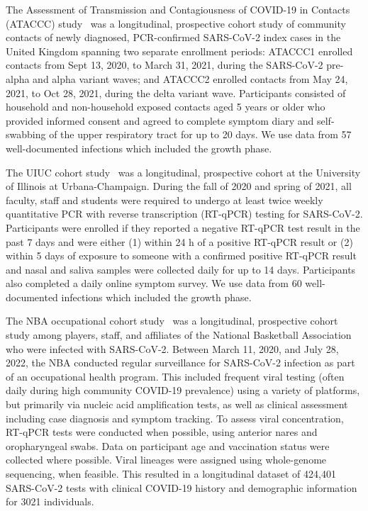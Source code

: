 \documentclass[12pt]{article}
\begin{document}
The Assessment of Transmission and Contagiousness of COVID-19 in Contacts (ATACCC) study~\cite{singanayagam2022community,hakki2022onset} was a longitudinal, prospective cohort study of community contacts of newly diagnosed, PCR-confirmed SARS-CoV-2 index cases in the United Kingdom spanning two separate enrollment periods: ATACCC1 enrolled contacts from Sept 13, 2020, to March 31, 2021, during the SARS-CoV-2 pre-alpha and alpha variant waves; and ATACCC2 enrolled contacts from May 24, 2021, to Oct 28, 2021, during the delta variant wave. Participants consisted of household and non-household exposed contacts aged 5 years or older who provided informed consent and agreed to complete symptom diary and self-swabbing of the upper respiratory tract for up to 20 days. We use data from 57 well-documented infections which included the growth phase. 

The UIUC cohort study~\cite{ke2022daily,Ranoa2022mitigation} was a longitudinal, prospective cohort at the University of Illinois at Urbana-Champaign. During the fall of 2020 and spring of 2021, all faculty, staff and students were required to undergo at least twice weekly quantitative PCR with reverse transcription (RT-qPCR) testing for SARS-CoV-2. Participants were enrolled if they reported a negative RT-qPCR test result in the past 7 days and were either (1) within 24 h of a positive RT-qPCR result or (2) within 5 days of exposure to someone with a confirmed positive RT-qPCR result and nasal and saliva samples were collected daily for up to 14 days. Participants also completed a daily online symptom survey. We use data from 60 well-documented infections which included the growth phase.

The NBA occupational cohort study~\cite{kissler2021viral,hay2022quantifying} was a longitudinal, prospective cohort study among players, staff, and affiliates of the National Basketball Association who were infected with SARS-CoV-2. Between March 11, 2020, and July 28, 2022, the NBA conducted regular surveillance for SARS-CoV-2 infection as part of an occupational health program. This included frequent viral testing (often daily during high community COVID-19 prevalence) using a variety of platforms, but primarily via nucleic acid amplification tests, as well as clinical assessment including case diagnosis and symptom tracking. To assess viral concentration, RT-qPCR tests were conducted when possible, using anterior nares and oropharyngeal swabs. Data on participant age and vaccination status were collected where possible. Viral lineages were assigned using whole-genome sequencing, when feasible. This resulted in a longitudinal dataset of 424,401 SARS-CoV-2 tests with clinical COVID-19 history and demographic information for 3021 individuals.
\end{document}
